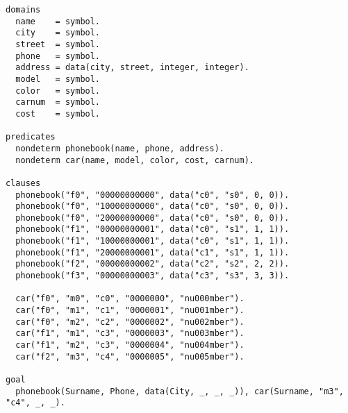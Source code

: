 \documentclass[a4paper,oneside,14pt]{extarticle}
\begin{document}

\setcounter{page}{2}
\renewcommand{\contentsname}{СОДЕРЖАНИЕ}


\begin{lstlisting}
domains
  name    = symbol.
  city    = symbol.
  street  = symbol.
  phone   = symbol.
  address = data(city, street, integer, integer).
  model   = symbol.
  color   = symbol.
  carnum  = symbol.
  cost    = symbol.

predicates
  nondeterm phonebook(name, phone, address).
  nondeterm car(name, model, color, cost, carnum).

clauses
  phonebook("f0", "00000000000", data("c0", "s0", 0, 0)).
  phonebook("f0", "10000000000", data("c0", "s0", 0, 0)).
  phonebook("f0", "20000000000", data("c0", "s0", 0, 0)).
  phonebook("f1", "00000000001", data("c0", "s1", 1, 1)).
  phonebook("f1", "10000000001", data("c0", "s1", 1, 1)).
  phonebook("f1", "20000000001", data("c1", "s1", 1, 1)).
  phonebook("f2", "00000000002", data("c2", "s2", 2, 2)).
  phonebook("f3", "00000000003", data("c3", "s3", 3, 3)).
  
  car("f0", "m0", "c0", "0000000", "nu000mber").
  car("f0", "m1", "c1", "0000001", "nu001mber").
  car("f0", "m2", "c2", "0000002", "nu002mber").
  car("f1", "m1", "c3", "0000003", "nu003mber").
  car("f1", "m2", "c3", "0000004", "nu004mber").
  car("f2", "m3", "c4", "0000005", "nu005mber").

goal
  phonebook(Surname, Phone, data(City, _, _, _)), car(Surname, "m3", "c4", _, _).
\end{lstlisting}





\end{document}
